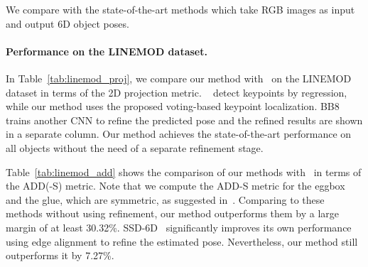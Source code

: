 \documentclass[10pt,twocolumn,letterpaper]{article}
\begin{document}
 
We compare with the state-of-the-art methods which take RGB images as input and output 6D object poses.

\paragraph{Performance on the LINEMOD dataset.} In Table~\ref{tab:linemod_proj}, we compare our method with~\cite{rad2017bb8, tekin2018real} on the LINEMOD dataset in terms of the 2D projection metric. ~\cite{rad2017bb8, tekin2018real} detect keypoints by regression, while our method uses the proposed voting-based keypoint localization. BB8~\cite{rad2017bb8} trains another CNN to refine the predicted pose and the refined results are shown in a separate column. Our method achieves the state-of-the-art performance on all objects without the need of a separate refinement stage.

Table~\ref{tab:linemod_add} shows the comparison of our methods with~\cite{rad2017bb8, liu2016ssd, tekin2018real} in terms of the ADD(-S) metric. Note that we compute the ADD-S metric for the eggbox and the glue, which are symmetric, as suggested in~\cite{xiang2017posecnn}. Comparing to these methods without using refinement, our method outperforms them by a large margin of at least 30.32\%. SSD-6D~\cite{kehl2017ssd} significantly improves its own performance using edge alignment to refine the estimated pose. Nevertheless, our method still outperforms it by 7.27\%.
\end{document}
